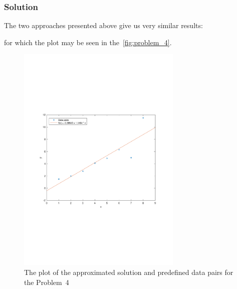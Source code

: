 \subsubsection*{Solution}
The two approaches presented above give us very similar results:

for which the plot may be seen in the~\autoref{fig:problem_4}.
\begin{figure}
  \centering
  \includegraphics[width=0.7\textwidth]{images/Problem_4_plot.pdf}
  \caption{The plot of the approximated solution and predefined data pairs
    for the Problem~4}\label{fig:problem_4}
\end{figure}
